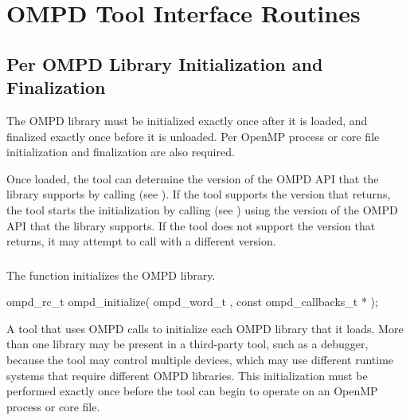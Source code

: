 
\section{OMPD Tool Interface Routines}
\label{subsec:ompd-api}

\subsection{Per OMPD Library Initialization and Finalization}

The OMPD library must be initialized exactly once after it is loaded, 
and finalized exactly once before it is unloaded. Per OpenMP process 
or core file initialization and finalization are also required.

Once loaded, the tool can determine the version of the OMPD API that 
the library supports by calling  (see
). If the tool supports the 
version that  returns, the tool starts the 
initialization by calling  (see
) using the version of the OMPD API 
that the library supports. If the tool does not support the version that
 returns, it may attempt to call 
 with a different version.



\subsubsection{}
\label{subsubsubsec:ompd_initialize}

\summary
The  function initializes the OMPD library.

\format
\begin{cspecific}
\begin{ompSyntax}
ompd_rc_t ompd_initialize(
  ompd_word_t ,
  const ompd_callbacks_t *
);
\end{ompSyntax}
\end{cspecific}

\descr
A tool that uses OMPD calls  to initialize each OMPD 
library that it loads. More than one library may be present in a third-party 
tool, such as a debugger, because the tool may control multiple devices, which
may use different runtime systems that require different OMPD libraries. This 
initialization must be performed exactly once before the tool can begin to 
operate on an OpenMP process or core file.

